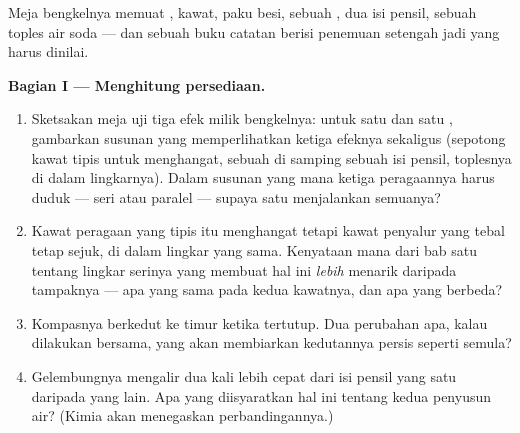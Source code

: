 \begin{problem}\label{pb:g8:electric-current-effects:1}
Meja bengkelnya memuat , kawat, paku besi, sebuah , dua
isi pensil, sebuah toples air soda --- dan sebuah buku catatan berisi
penemuan setengah jadi yang harus dinilai.

\medskip\noindent\textbf{Bagian I --- Menghitung persediaan.}
\begin{enumerate}
  \item Sketsakan meja uji tiga efek milik bengkelnya: untuk satu
         dan satu , gambarkan susunan yang
        memperlihatkan ketiga efeknya sekaligus (sepotong kawat tipis
        untuk menghangat, sebuah  di samping sebuah isi pensil,
        toplesnya di dalam lingkarnya). Dalam susunan yang mana
        ketiga peragaannya harus duduk --- seri atau paralel --- supaya
        satu  menjalankan semuanya?
  \item Kawat peragaan yang tipis itu menghangat tetapi kawat
        penyalur yang tebal tetap sejuk, di dalam lingkar yang sama.
        Kenyataan mana dari bab satu tentang lingkar serinya yang
        membuat hal ini \emph{lebih} menarik daripada tampaknya ---
        apa yang sama pada kedua kawatnya, dan apa yang berbeda?
  \item Kompasnya berkedut ke timur ketika  tertutup. Dua
        perubahan apa, kalau dilakukan bersama, yang akan membiarkan
        kedutannya persis seperti semula?
  \item Gelembungnya mengalir dua kali lebih cepat dari isi pensil
        yang satu daripada yang lain. Apa yang diisyaratkan hal ini
        tentang kedua penyusun air? (Kimia akan menegaskan
        perbandingannya.)
\end{enumerate}


\end{problem}
